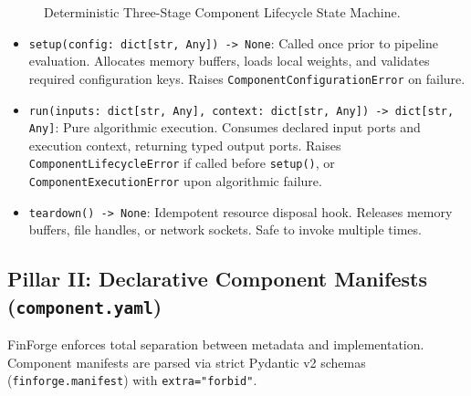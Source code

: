 \documentclass[11pt,a4paper]{article}
\begin{document}
\begin{figure}[h!]
\centering
{}
\caption{Deterministic Three-Stage Component Lifecycle State Machine.}
\label{fig:lifecycle}
\end{figure}

\begin{itemize}[leftmargin=1.5em, itemsep=2pt]
    \item \texttt{setup(config: dict[str, Any]) -> None}: Called once prior to pipeline evaluation. Allocates memory buffers, loads local weights, and validates required configuration keys. Raises \texttt{ComponentConfigurationError} on failure.
    \item \texttt{run(inputs: dict[str, Any], context: dict[str, Any]) -> dict[str, Any]}: Pure algorithmic execution. Consumes declared input ports and execution context, returning typed output ports. Raises \texttt{ComponentLifecycleError} if called before \texttt{setup()}, or \texttt{ComponentExecutionError} upon algorithmic failure.
    \item \texttt{teardown() -> None}: Idempotent resource disposal hook. Releases memory buffers, file handles, or network sockets. Safe to invoke multiple times.
\end{itemize}

\subsection{Pillar II: Declarative Component Manifests (\texttt{component.yaml})}
FinForge enforces total separation between metadata and implementation. Component manifests are parsed via strict Pydantic v2 schemas (\texttt{finforge.manifest}) with \texttt{extra="forbid"}.
\end{document}
